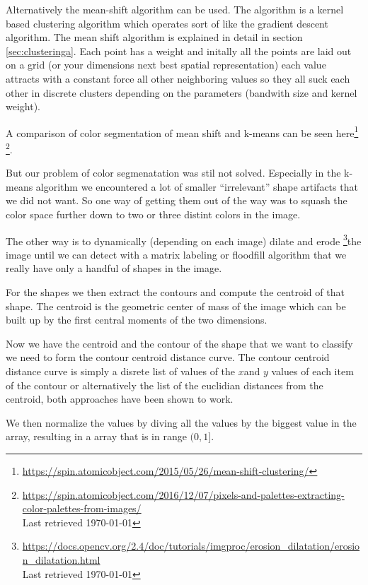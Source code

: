 \documentclass[journal]{vgtc}       %
\begin{document}
Alternatively the mean-shift algorithm can be used. The algorithm is a kernel based clustering algorithm which operates sort of like the gradient descent algorithm. The mean shift algorithm is explained in detail in section \ref{sec:clusteringa}.
Each point has a weight and initally all the points are laid out on a grid (or your dimensions next best spatial representation) each value attracts with a constant force all other neighboring values so they all suck each other in discrete clusters depending on the parameters (bandwith size and kernel weight). 

A comparison of color segmentation of mean shift and  k-means can be seen here\footnote{\url{https://spin.atomicobject.com/2015/05/26/mean-shift-clustering/}} 
\footnote{\url{https://spin.atomicobject.com/2016/12/07/pixels-and-palettes-extracting-color-palettes-from-images/} \\ Last retrieved \today}. 


But our problem of color segmenatation was stil not solved. Especially in the k-means algorithm we encountered a lot of smaller ``irrelevant'' shape artifacts that we did not want.
So one way of getting them out of the way was to squash the color space further down to two or three distint colors in the image.

The other way is to  dynamically (depending on each image) dilate and erode \footnote{\url{https://docs.opencv.org/2.4/doc/tutorials/imgproc/erosion_dilatation/erosion_dilatation.html}\\ Last retrieved \today}the image until we can detect with a matrix labeling  or   floodfill algorithm that we really have only a handful of shapes in the image.

For the shapes we then extract the contours and compute the centroid of that shape.
The centroid is the geometric center of mass of the image which can be built up by the first central moments of the two dimensions.

Now we have the centroid and the contour of the shape that we want to classify we need to form the contour centroid distance curve.
The contour centroid distance curve is simply a disrete list of values of the \(x\)and \(y\)  values of each item of the contour  or alternatively the list of the euclidian  distances from the centroid, both approaches have been shown to work.

We then normalize the values by diving all the values by the biggest value in the array, resulting in a array that is in range $(0,1]$.
\end{document}
